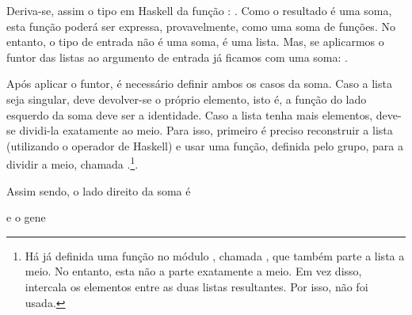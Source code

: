 \documentclass[a4paper]{article}
\begin{document}
Deriva-se, assim o tipo em Haskell da função : . Como o resultado é uma soma, esta função poderá ser expressa, provavelmente, como uma soma de funções. No entanto, o tipo de entrada não é uma soma, é uma lista. Mas, se aplicarmos o funtor das listas ao argumento de entrada já ficamos com uma soma: .

Após aplicar o funtor, é necessário definir ambos os casos da soma. Caso a lista seja singular, deve devolver-se o próprio elemento, isto é, a função do lado esquerdo da soma deve ser a identidade. Caso a lista tenha mais elementos, deve-se dividi-la exatamente ao meio. Para isso, primeiro é preciso reconstruir a lista (utilizando o operador  de Haskell) e usar uma função, definida pelo grupo, para a dividir a meio, chamada .\footnote{Há já definida uma função no módulo , chamada , que também parte a lista a meio. No entanto, esta não a parte exatamente a meio. Em vez disso, intercala os elementos entre as duas listas resultantes. Por isso, não foi usada.}.

Assim sendo, o lado direito da soma é


e o gene 

\end{document}
